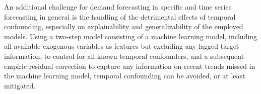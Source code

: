 \documentclass[BCOR=1mm, DIV=calc,10pt,
twoside=true,
twocolumn,
headings=normal]{scrartcl}
\begin{document}
An additional challenge for demand forecasting in specific and time series forecasting in general is the handling of the detrimental effects of temporal confounding, especially on explainability and generalizability of the employed models. Using a two-step model consisting of a machine learning model, including all available exogenous variables as features but excluding any lagged target information, to control for all known temporal confounders, and a subsequent empiric residual correction to capture any information on recent trends missed in the machine learning model, temporal confounding can be avoided, or at least mitigated.


%
%
%
%
%
%
%
%
%
%
%
\end{document}
